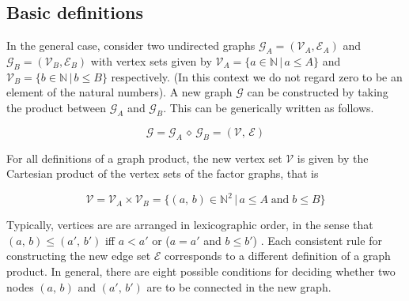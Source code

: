 \subsection{Basic definitions}

In the general case, consider two undirected graphs $\mathcal{G}_A = (\mathcal{V}_A, \mathcal{E}_A)$ and $\mathcal{G}_B = (\mathcal{V}_B, \mathcal{E}_B)$ with vertex sets given by $\mathcal{V}_A = \{a \in \mathbb{N} \, | \, a \leq A \}$ and $\mathcal{V}_B = \{b \in \mathbb{N} \, | \, b \leq B \}$ respectively. (In this context we do not regard zero to be an element of the natural numbers). A new graph $\mathcal{G}$ can be constructed by taking the product between $\mathcal{G}_A$ and $\mathcal{G}_B$. This can be generically written as follows.

\begin{equation}
    \mathcal{G} = \mathcal{G}_A \, \diamond \, \mathcal{G}_B = (\mathcal{V}, \, \mathcal{E})
\end{equation}

For all definitions of a graph product, the new vertex set $\mathcal{V}$ is given by the Cartesian product of the vertex sets of the factor graphs, that is

\begin{equation}
    \mathcal{V} = \mathcal{V}_A \times \mathcal{V}_B = \{(a, \, b) \in \mathbb{N}^2 \, | \, a \leq A \; \text{and} \; b \leq B \}
\end{equation}


Typically, vertices are are arranged in lexicographic order, in the sense that $(a, \, b) \leq (a',\, b')$ iff $a < a'$ or ($a = a'$ and $b \leq b'$) \citep{Harzheim2005}. Each consistent rule for constructing the new edge set $\mathcal{E}$ corresponds to a different definition of a graph product. In general, there are eight possible conditions for deciding whether two nodes $(a, \, b)$ and $(a',\,  b')$ are to be connected in the new graph.



